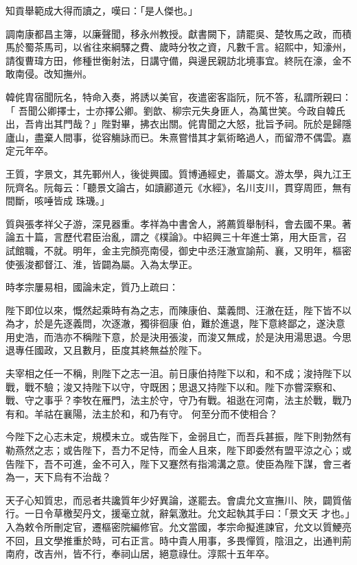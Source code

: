 \begin{pinyinscope}
 知貢舉範成大得而讀之，嘆曰：「是人傑也。」



 調南康都昌主簿，以廉聲聞，移永州教授。獻書闕下，請罷吳、楚牧馬之政，而積馬於蜀茶馬司，以省往來綱驛之費、歲時分牧之資，凡數千言。紹熙中，知濠州，請復曹瑋方田，修種世衡射法，日講守備，與邊民親訪北境事宜。終阮在濠，金不敢南侵。改知撫州。



 韓侂胄宿聞阮名，特命入奏，將誘以美官，夜遣密客詣阮，阮不答，私謂所親曰：「
 吾聞公卿擇士，士亦擇公卿。劉歆、柳宗元失身匪人，為萬世笑。今政自韓氏出，吾肯出其門哉？」陛對畢，拂衣出關。侂胄聞之大怒，批旨予祠。阮於是歸隱廬山，盡棄人間事，從容觴詠而已。朱熹嘗惜其才氣術略過人，而留滯不偶雲。嘉定元年卒。



 王質，字景文，其先鄆州人，後徙興國。質博通經史，善屬文。游太學，與九江王阮齊名。阮每云：「聽景文論古，如讀酈道元《水經》，名川支川，貫穿周匝，無有間斷，咳唾皆成
 珠璣。」



 質與張孝祥父子游，深見器重。孝祥為中書舍人，將薦質舉制科，會去國不果。著論五十篇，言歷代君臣治亂，謂之《樸論》。中紹興三十年進士第，用大臣言，召試館職，不就。明年，金主完顏亮南侵，御史中丞汪澈宣諭荊、襄，又明年，樞密使張浚都督江、淮，皆闢為屬。入為太學正。



 時孝宗屢易相，國論未定，質乃上疏曰：



 陛下即位以來，慨然起乘時有為之志，而陳康伯、葉義問、汪澈在廷，陛下皆不以為才，於是先逐義問，次逐澈，獨徘徊康
 伯，難於進退，陛下意終鄙之，遂決意用史浩，而浩亦不稱陛下意，於是決用張浚，而浚又無成，於是決用湯思退。今思退專任國政，又且數月，臣度其終無益於陛下。



 夫宰相之任一不稱，則陛下之志一沮。前日康伯持陛下以和，和不成；浚持陛下以戰，戰不驗；浚又持陛下以守，守既困；思退又持陛下以和。陛下亦嘗深察和、戰、守之事乎？李牧在雁門，法主於守，守乃有戰。祖逖在河南，法主於戰，戰乃有和。羊祜在襄陽，法主於和，和乃有守。
 何至分而不使相合？



 今陛下之心志未定，規模未立。或告陛下，金弱且亡，而吾兵甚振，陛下則勃然有勒燕然之志；或告陛下，吾力不足恃，而金人且來，陛下即委然有盟平涼之心；或告陛下，吾不可進，金不可入，陛下又蹇然有指鴻溝之意。使臣為陛下謀，會三者為一，天下烏有不治哉？



 天子心知質忠，而忌者共讒質年少好異論，遂罷去。會虞允文宣撫川、陜，闢質偕行。一日令草檄契丹文，援毫立就，辭氣激壯。允文起執其手曰：「景文天
 才也。」入為敕令所刪定官，遷樞密院編修官。允文當國，孝宗命擬進諫官，允文以質鯁亮不回，且文學推重於時，可右正言。時中貴人用事，多畏憚質，陰沮之，出通判荊南府，改吉州，皆不行，奉祠山居，絕意祿仕。淳熙十五年卒。




\end{pinyinscope}

